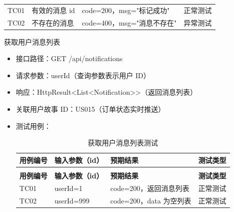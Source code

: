 \begin{levellist}
\begin{levellist}
\begin{itemize}
\begin{longtable}{>{\centering\arraybackslash}m{1.7cm} >{\centering\arraybackslash}m{3cm} >{\centering\arraybackslash}m{6.3cm} >{\centering\arraybackslash}m{2cm}}
                      \bottomrule
                      \endfoot

                      TC01          & 有效的消息 id          & code=200，msg="标记成功"  & 正常测试          \\
                      TC02          & 不存在的消息            & code=400，msg="消息不存在" & 异常测试          \\
                  \end{longtable}
        \end{itemize}

        \item 获取用户消息列表
        \begin{itemize}
            \item 接口路径：GET /api/notifications
            \item 请求参数：userId（查询参数表示用户 ID）
            \item 响应：HttpResult<List<Notification>>（返回消息列表）
            \item 关联用户故事 ID：US015（订单状态实时推送）
            \item 测试用例：
                  \begin{longtable}{>{\centering\arraybackslash}m{2cm} >{\centering\arraybackslash}m{4cm} >{\centering\arraybackslash}m{5cm} >{\centering\arraybackslash}m{2cm}}

                      \caption{获取用户消息列表测试} \label{tab:training}                              \\

                      \toprule
                      \textbf{用例编号} & \textbf{输入参数（id）} & \textbf{预期结果}      & \textbf{测试类型} \\
                      \midrule
                      \endfirsthead

                      \multicolumn{4}{c}{{\tablename\ \thetable{} 续表}}                       \\
                      \toprule
                      \textbf{用例编号} & \textbf{输入参数（id）} & \textbf{预期结果}      & \textbf{测试类型} \\
                      \midrule
                      \endhead

                      \bottomrule
                      \endfoot


                      TC01          & userId=1          & code=200，返回消息列表    & 正常测试          \\
                      TC02          & userId=999        & code=200，data 为空列表 & 正常测试          \\
                  \end{longtable}
        \end{itemize}


\end{levellist}
\end{levellist}
